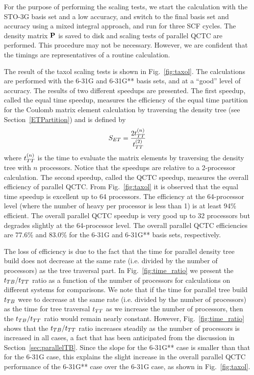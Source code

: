 \commentoutA{\documentclass[prl,aps,twocolumn,twocolumngrid,superbib]{revtex4}}
\begin{document}
For the purpose of performing the scaling tests, we start the
calculation with the STO-3G basis set and a low accuracy, and switch
to the final basis set and accuracy using a mixed integral approach,
and run for three SCF cycles. The density matrix ${\bf P}$ is saved to
disk and scaling tests of parallel QCTC are performed. This procedure
may not be necessary. However, we are confident that the timings are
representatives of a routine calculation.

The result of the taxol scaling tests is shown in
Fig.~\ref{fig:taxol}.  The calculations are performed with the 6-31G
and 6-31G** basis sets, and at a ``good'' level of accuracy.  The
results of two different speedups are presented.  The first speedup,
called the equal time speedup, measures the efficiency of the equal
time partition for the Coulomb matrix element calculation by
traversing the density tree (see Section~\ref{ETPartition}) and is
defined by
\begin{equation}
S_{ET} = \frac{2t_{TT}^{(n)}}{t_{TT}^{(2)}}
\end{equation}
where $t_{TT}^{(n)}$ is the time to evaluate the matrix elements by
traversing the density tree with $n$ processors. Notice that the
speedups are relative to a 2-processor calculation.  The second
speedup, called the QCTC speedup, measures the overall efficiency of
parallel QCTC.  From Fig.~\ref{fig:taxol} it is observed that the
equal time speedup is excellent up to 64 processors. The efficiency at
the 64-processor level (where the number of heavy per processor is
less than 1) is at least 94\% efficient.
The overall parallel QCTC speedup is very good up to 32 processors but
degrades slightly at the 64-processor level.  The overall parallel
QCTC efficiencies are
77.6\% and 83.0\% for the 6-31G and 6-31G** basis sets, respectively.

The loss of efficiency is due to the fact that the time for parallel
density tree build does not decrease at the same rate (i.e.  divided
by the number of processors) as the tree traversal part.  In
Fig.~\ref{fig:time_ratio} we present the $t_{TB}/t_{TT}$ ratio as a
function of the number of processors for calculations on different
systems for comparisons.  We note that if the time for parallel tree
build $t_{TB}$ were to decrease at the same rate (i.e. divided by the
number of processors) as the time for tree traversal $t_{TT}$ as we
increase the number of processors, then the $t_{TB}/t_{TT}$ ratio would
remain nearly constant.  However, Fig.~\ref{fig:time_ratio} shows that
the $t_{TB}/t_{TT}$ ratio increases steadily as the number of processors
is increased in all cases, a fact that has been anticipated from the
discussion in Section~\ref{sec:parallelTB}.  Since the slope for the
6-31G** case is smaller than that for the 6-31G case, this explains
the slight increase in the overall parallel QCTC performance of the
6-31G** case over the 6-31G case, as shown in Fig.~\ref{fig:taxol}.
\end{document}

